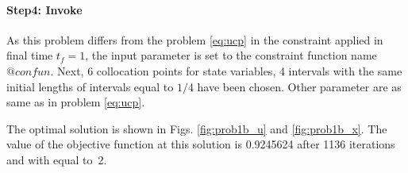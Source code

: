 \paragraph{Step4: Invoke~}

{\small }

As this problem differs from the problem \eqref{eq:ucp} in the
constraint applied in final time $t_{f} = 1$, the input parameter
 is set to the constraint function name
$@confun$. Next, 6 collocation points for state variables, 4 intervals
with the same initial lengths of intervals equal to $1/4$ have been
chosen. Other parameter are as same as in problem \eqref{eq:ucp}.

The optimal solution is shown in Figs. \ref{fig:prob1b_u} and
\ref{fig:prob1b_x}. The value of the objective function at this
solution is 0.9245624 after 1136 iterations and with 
equal to~2.

